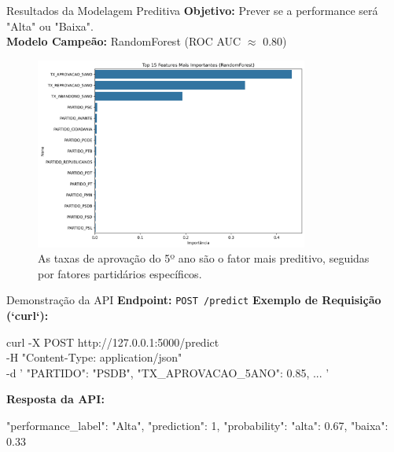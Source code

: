 \documentclass{beamer}
\begin{document}
\begin{frame}{Resultados da Modelagem Preditiva}
    \textbf{Objetivo:} Prever se a performance será "Alta" ou "Baixa".\\
    \textbf{Modelo Campeão:} RandomForest (ROC AUC $\approx$ 0.80)
    \vfill
    \begin{figure}
        \centering
        \includegraphics[width=0.8\textwidth]{assets/feature_importance.png}
        \caption{As taxas de aprovação do 5º ano são o fator mais preditivo, seguidas por fatores partidários específicos.}
    \end{figure}
\end{frame}

\begin{frame}[fragile]{Demonstração da API}
    \textbf{Endpoint:} \texttt{POST /predict}
    \vfill
    \textbf{Exemplo de Requisição (`curl`):}
    \begin{semiverbatim}
    curl -X POST http://127.0.0.1:5000/predict \\
    -H "Content-Type: application/json" \\
    -d '{
        "PARTIDO": "PSDB",
        "TX_APROVACAO_5ANO": 0.85,
        ...
    }'
    \end{semiverbatim}
    \vfill
    \textbf{Resposta da API:}
    \begin{semiverbatim}
    {
      "performance_label": "Alta",
      "prediction": 1,
      "probability": { "alta": 0.67, "baixa": 0.33 }
    }
    \end{semiverbatim}
\end{frame}
\end{document}

